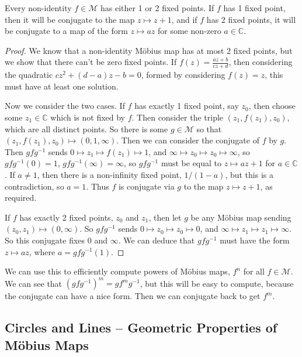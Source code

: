 \documentclass[a4paper]{scrartcl}
\begin{document}
\begin{theorem}
	Every non-identity $f \in \mathcal{M}$ has either 1 or 2 fixed points. If $f$ has 1 fixed point, then it will be conjugate to the map $z \mapsto z + 1$, and if $f$ has 2 fixed points, it will be conjugate to a map of the form $z \mapsto az$ for some non-zero $a \in \mathbb{C}$.
\end{theorem}
\begin{proof}
	We know that a non-identity Möbius map has at most 2 fixed points, but we show that there can't be zero fixed points. If $f(z) = \frac{az + b}{cz + d}$, then considering the quadratic $cz^2 + (d - a)z - b = 0$, formed by considering $f(z) = z$, this must have at least one solution.

	Now we consider the two cases. If $f$ has exactly 1 fixed point, say $z_0$, then choose some $z_1 \in \mathbb{C}$ which is not fixed by $f$. Then consider the triple $(z_1, f(z_1), z_0)$, which are all distinct points.  So there is some $g \in \mathcal{M}$ so that $(z_1, f(z_1), z_0) \mapsto (0, 1, \infty)$.
	Then we can consider the conjugate of $f$ by $g$. Then $gfg^{-1}$ sends $0 \mapsto z_1 \mapsto f(z_1) \mapsto 1$, and $\infty \mapsto z_0 \mapsto z_0 \mapsto \infty$, so $gfg^{-1}(0) = 1$, $gfg^{-1}(\infty) = \infty$, so $gfg^{-1}$ must be equal to $z \mapsto az + 1$ for $a \in \mathbb{C}$. If $a \neq 1$, then there is a non-infinity fixed point, $1/(1 - a)$, but this is a contradiction, so $a = 1$. Thus $f$ is conjugate via $g$ to the map $z \mapsto z + 1$, as required.

	If $f$ has exactly 2 fixed points, $z_0$ and $z_1$, then let $g$ be any Möbius map sending $(z_0, z_1) \mapsto (0, \infty)$. So $gfg^{-1}$ sends $0 \mapsto z_0 \mapsto z_0 \mapsto 0$, and $\infty \mapsto z_1 \mapsto z_1 \mapsto \infty$. So this conjugate fixes $0$ and $\infty$. We can deduce that $gfg^{-1}$ must have the form $z \mapsto az$, where $a = gfg^{-1}(1)$.
\end{proof}

We can use this to efficiently compute powers of Möbius maps, $f^n$ for all $f \in \mathcal{M}$. 
We can see that $(gfg^{-1})^m = gf^m g^{-1}$, but this will be easy to compute, because the conjugate can have a nice form. Then we can conjugate back to get $f^m$.


\subsection{Circles and Lines -- Geometric Properties of Möbius Maps}
\end{document}
